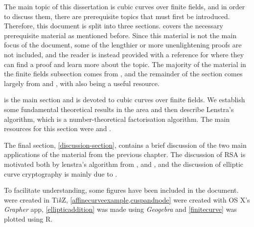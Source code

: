 The main topic of this dissertation is cubic curves over finite fields, and in order to discuss them, there are prerequisite topics that must first be introduced.
Therefore, this document is split into three sections.
 covers the necessary prerequisite material as mentioned before.
Since this material is not the main focus of the document, some of the lengthier or more unenlightening proofs are not included, and the reader is instead provided with a reference for where they can find a proof and learn more about the topic.
The majority of the material in the finite fields subsection comes from \cite{111-lectures,322-lectures}, and the remainder of the section comes largely from \cite{323-lectures} and \cite{bix2006}, with \cite{silverman2009} also being a useful resource.

 is the main section and is devoted to cubic curves over finite fields.
We establish some fundamental theoretical results in the area and then describe Lenstra's algorithm, which is a number-theoretical factorisation algorithm.
The main resources for this section were \cite{tate2013} and \cite{silverman2009}.

The final section, \cref{discussion-section}, contains a brief discussion of the two main applications of the material from the previous chapter.
The discussion of RSA is motivated both by lenstra's algorithm from \cite{lenstra1987}, \cite{tate2013} and \cite{menezes1996}, and the discussion of elliptic curve cryptography is mainly due to \cite{tate2013}.

To facilitate understanding, some figures have been included in the document.
 were created in Ti\textit{k}Z, \cref{affinecurveexample,cuspandnode} were created with OS X's \emph{Grapher} app, \cref{ellipticaddition} was made using \emph{Geogebra} and \cref{finitecurve} was plotted using \textsf{R}.

